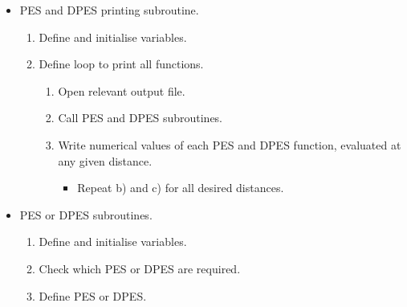 \begin{itemize}
\item PES and DPES printing subroutine.
\begin{enumerate}
\item Define and initialise variables.
\item Define loop to print all functions.
\begin{enumerate}
\item Open relevant output file.
\item Call PES and DPES subroutines.
\item Write numerical values of each PES and DPES function, evaluated at any given distance.
\begin{itemize}
\item Repeat b) and c) for all desired distances.
\end{itemize}
\end{enumerate}
\end{enumerate}
\end{itemize}

\begin{itemize}
\item PES or DPES subroutines.
\begin{enumerate}
\item Define and initialise variables.
\item Check which PES or DPES are required.
\item Define PES or DPES.
\end{enumerate}
\end{itemize}
%